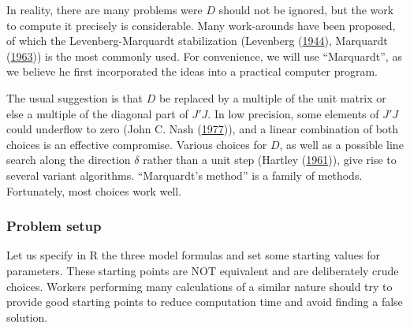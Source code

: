 \documentclass[
]{article}
\begin{document}
In reality, there are many problems were \(D\) should not be ignored,
but the work to compute it precisely is considerable. Many work-arounds
have been proposed, of which the Levenberg-Marquardt stabilization
(Levenberg (\protect\hyperlink{ref-Levenberg1944}{1944}), Marquardt
(\protect\hyperlink{ref-Marquardt1963}{1963})) is the most commonly
used. For convenience, we will use ``Marquardt'', as we believe he first
incorporated the ideas into a practical computer program.

The usual suggestion is that \(D\) be replaced by a multiple of the unit
matrix or else a multiple of the diagonal part of \(J' J\). In low
precision, some elements of \(J' J\) could underflow to zero (John C.
Nash (\protect\hyperlink{ref-jn77ima}{1977})), and a linear combination
of both choices is an effective compromise. Various choices for \(D\),
as well as a possible line search along the direction \(\delta\) rather
than a unit step (Hartley (\protect\hyperlink{ref-Hartley1961}{1961})),
give rise to several variant algorithms. ``Marquardt's method'' is a
family of methods. Fortunately, most choices work well.

\hypertarget{problem-setup}{%
\subsubsection{Problem setup}\label{problem-setup}}

Let us specify in R the three model formulas and set some starting
values for parameters. These starting points are NOT equivalent and are
deliberately crude choices. Workers performing many calculations of a
similar nature should try to provide good starting points to reduce
computation time and avoid finding a false solution.
\end{document}
